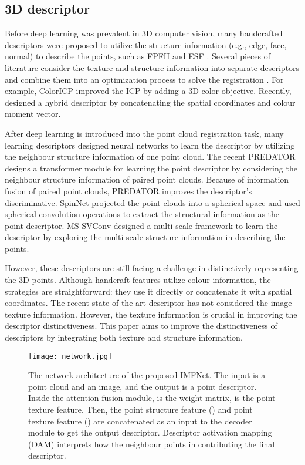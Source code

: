\documentclass[10pt,twocolumn,letterpaper]{article}
\begin{document}
\subsection{3D descriptor}
Before deep learning was prevalent in 3D computer vision, many handcrafted descriptors were proposed to utilize the structure information (e.g., edge, face, normal) to describe the points, such as FPFH \cite{rusu2009fast} and ESF  \cite{wohlkinger2011ensemble}. Several pieces of literature consider the texture and structure information into separate descriptors and combine them into an optimization process to solve the registration \cite{lin2016color, park2017colored}. For example, ColorICP \cite{park2017colored} improved the ICP by adding a 3D color objective. Recently, \cite{yang2020color} designed a hybrid descriptor by concatenating the spatial coordinates and colour moment vector.

After deep learning is introduced into the point cloud registration task, many learning descriptors \cite{zeng20173dmatch,choy2019fully,bai2020d3feat}  designed neural networks to learn the descriptor by utilizing the neighbour structure information of one point cloud. The recent PREDATOR \cite{huang2021predator} designs a transformer module for learning the point descriptor by considering the neighbour structure information of paired point clouds. Because of information fusion of paired point clouds, PREDATOR improves the descriptor's discriminative. SpinNet \cite{ao2021spinnet} projected the point clouds into a spherical space and used spherical convolution operations to extract the structural information as the point descriptor. MS-SVConv \cite{horache20213d} designed a multi-scale framework to learn the descriptor by exploring the multi-scale structure information in describing the points.

However, these descriptors are still facing a challenge in distinctively representing the 3D points. Although handcraft features utilize colour information, the strategies are straightforward: they use it directly or concatenate it with spatial coordinates. The recent state-of-the-art descriptor has not considered the image texture information. However, the texture information is crucial in improving the descriptor distinctiveness. This paper aims to improve the distinctiveness of descriptors by integrating both texture and structure information.

\begin{figure*}[htp]
	\centering
	\texttt{[image: network.jpg]}
	\caption{The network architecture of the proposed IMFNet. The input is a point cloud and an image, and the output is a point descriptor. Inside the attention-fusion module,  is the weight matrix,  is the point texture feature. Then, the point structure feature () and point texture feature () are concatenated as an input to the decoder module to get the output descriptor. Descriptor activation mapping (DAM) interprets how the neighbour points in contributing the final descriptor.}
	\label{fig:2}
\end{figure*}
\end{document}
